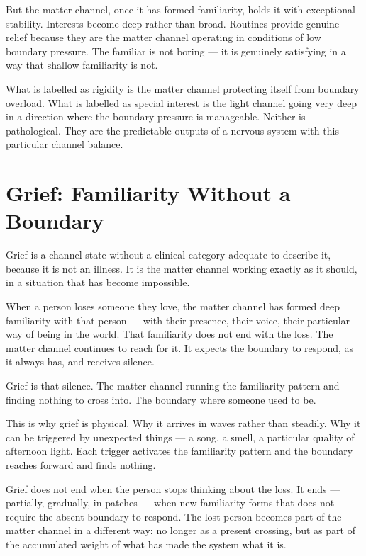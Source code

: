 \documentclass[12pt]{article}
\begin{document}
But the matter channel, once it has formed familiarity, holds it with exceptional
stability. Interests become deep rather than broad. Routines provide genuine
relief because they are the matter channel operating in conditions of low boundary
pressure. The familiar is not boring --- it is genuinely satisfying in a way that
shallow familiarity is not.

What is labelled as rigidity is the matter channel protecting itself from
boundary overload. What is labelled as special interest is the light channel
going very deep in a direction where the boundary pressure is manageable. Neither
is pathological. They are the predictable outputs of a nervous system with this
particular channel balance.

\section{Grief: Familiarity Without a Boundary}

Grief is a channel state without a clinical category adequate to describe it,
because it is not an illness. It is the matter channel working exactly as it
should, in a situation that has become impossible.

When a person loses someone they love, the matter channel has formed deep
familiarity with that person --- with their presence, their voice, their
particular way of being in the world. That familiarity does not end with the
loss. The matter channel continues to reach for it. It expects the boundary to
respond, as it always has, and receives silence.

Grief is that silence. The matter channel running the familiarity pattern and
finding nothing to cross into. The boundary where someone used to be.

This is why grief is physical. Why it arrives in waves rather than steadily.
Why it can be triggered by unexpected things --- a song, a smell, a particular
quality of afternoon light. Each trigger activates the familiarity pattern and
the boundary reaches forward and finds nothing.

Grief does not end when the person stops thinking about the loss. It ends ---
partially, gradually, in patches --- when new familiarity forms that does not
require the absent boundary to respond. The lost person becomes part of the
matter channel in a different way: no longer as a present crossing, but as part
of the accumulated weight of what has made the system what it is.
\end{document}
